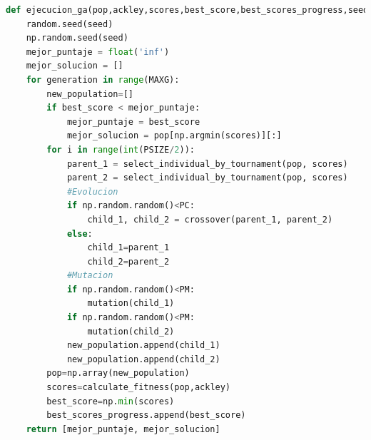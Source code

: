 \documentclass[10pt]{article}
\begin{document}
\begin{lstlisting}[language=Python]
def ejecucion_ga(pop,ackley,scores,best_score,best_scores_progress,seed):
    random.seed(seed)
    np.random.seed(seed)
    mejor_puntaje = float('inf')
    mejor_solucion = []
    for generation in range(MAXG):
        new_population=[]
        if best_score < mejor_puntaje:
            mejor_puntaje = best_score
            mejor_solucion = pop[np.argmin(scores)][:]
        for i in range(int(PSIZE/2)):
            parent_1 = select_individual_by_tournament(pop, scores)
            parent_2 = select_individual_by_tournament(pop, scores)
            #Evolucion
            if np.random.random()<PC:
                child_1, child_2 = crossover(parent_1, parent_2)
            else:
                child_1=parent_1
                child_2=parent_2
            #Mutacion
            if np.random.random()<PM:
                mutation(child_1)
            if np.random.random()<PM:
                mutation(child_2)
            new_population.append(child_1)
            new_population.append(child_2)
        pop=np.array(new_population)
        scores=calculate_fitness(pop,ackley)
        best_score=np.min(scores)
        best_scores_progress.append(best_score)
    return [mejor_puntaje, mejor_solucion]
\end{lstlisting}
\newpage
\tableofcontents
\end{document}
